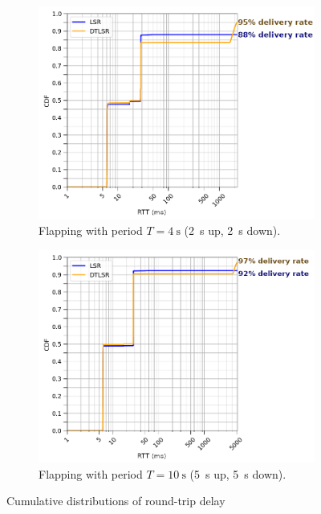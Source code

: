 \documentclass[withindex,glossary,openany]{cam-thesis}
\begin{document}
\begin{figure}
\centering
\begin{subfigure}{0.8\textwidth}
  \centering
  \hspace*{1.1cm}
  \includegraphics[width=1\linewidth]{delay_box_flap2}
  \caption{Flapping with period $T=\SI{4}{\s}$ (\SI{2}{\s} up, \SI{2}{\s} down).}
  \label{fig:box_2}
\end{subfigure}
\centering
\begin{subfigure}{0.8\textwidth}
  \centering
  \hspace*{1.1cm}
  \includegraphics[width=1\linewidth]{delay_box_flap5}
  \caption{Flapping with period $T=\SI{10}{\s}$ (\SI{5}{\s} up, \SI{5}{\s} down).}
  \label{fig:box_5}
\end{subfigure}
\caption{Cumulative distributions of round-trip delay}
\label{fig:box}
\end{figure}
\end{document}
